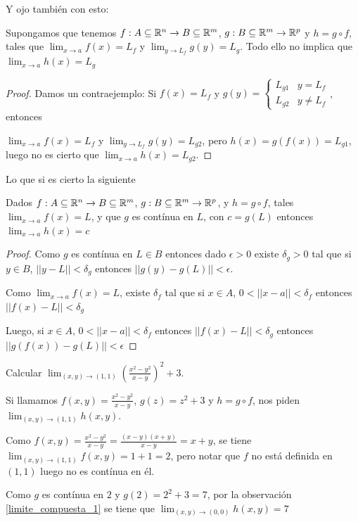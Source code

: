 Y ojo también con esto:

\begin{observation}
Supongamos que tenemos $f: A \subseteq \mathbb{R}^n \to B \subseteq \mathbb{R}^m$, $g : B \subseteq \mathbb{R}^m \to \mathbb{R}^p$ y $h = g \circ f$, tales que $\lim_{x \to a} f(x) = L_f$ y $\lim_{y \to L_f} g(y) = L_g$.  Todo ello no implica que $\lim_{x \to a} h(x) = L_g$
\end{observation}

\begin{proof}
Damos un contraejemplo:  Si $f(x) = L_f$ y $g(y) = \begin{cases} L_{g1} & y = L_f \\ L_{g2} & y \neq L_f \end{cases}$, entonces

$\lim_{x \to a} f(x) = L_f$ y $\lim_{y \to L_f} g(y) = L_{g2}$, pero $h(x) = g(f(x)) = L_{g1}$, luego no es cierto que $\lim_{x \to a} h(x) = L_{g2}$.
\end{proof}

Lo que si es cierto la siguiente

\begin{observation}[Optativa] \label{limite_compuesta_1}
Dados $f: A \subseteq \mathbb{R}^n \to B \subseteq \mathbb{R}^m$, $g : B \subseteq \mathbb{R}^m \to \mathbb{R}^p$, y $h = g \circ f$, tales $\lim_{x \to a} f(x) = L$, y que $g$ es contínua en $L$, con $c = g(L)$ entonces $\lim_{x \to a} h(x) = c$
\end{observation}

\begin{proof}
Como $g$ es contínua en $L \in B$ entonces dado $\epsilon > 0$ existe $\delta_g > 0$ tal que si $y \in B$, $||y - L|| < \delta_g$ entonces $||g(y) - g(L)|| < \epsilon$.

Como $\lim_{x \to a} f(x) = L$, existe $\delta_f$ tal que si $x \in A$, $0 < ||x-a|| < \delta_f$ entonces $||f(x) - L|| < \delta_g$

Luego, si $x \in A$, $0 < ||x-a|| < \delta_f$ entonces $||f(x) - L|| < \delta_g $ entonces $||g(f(x)) - g(L)|| < \epsilon$
\end{proof}

\begin{example}
Calcular $\lim_{(x,y) \to (1,1)} (\frac{x^2 - y^2}{x-y})^2 + 3 $.

Si llamamos $f(x,y) = \frac{x^2 - y^2}{x-y}$, $g(z) = z^2 + 3$ y $h = g \circ f$, nos piden $\lim_{(x,y) \to (1,1)} h(x,y)$.

Como $f(x,y) = \frac{x^2 - y^2}{x-y} = \frac{(x-y)(x+y)}{x-y} = x+y$, se tiene $\lim_{(x,y) \to (1,1)} f(x,y) = 1+1 = 2 $, pero notar que $f$ no está definida en $(1,1)$ luego no es contínua en él.

Como $g$ es contínua en $2$ y $g(2) = 2^2 + 3 = 7$, por la observación \ref{limite_compuesta_1} se tiene que $\lim_{(x,y) \to (0,0)} h(x,y) = 7$
\end{example}

